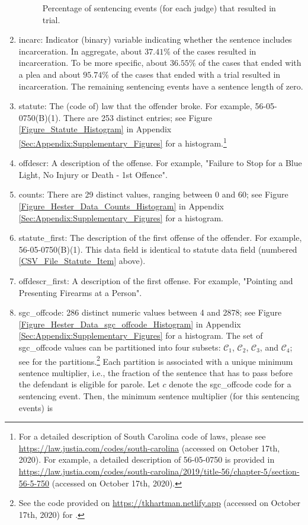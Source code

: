 \documentclass[11pt, oneside]{article}   	%
\theoremstyle{ModifiedStyle}
\begin{document}
\begin{enumerate}
\begin{figure}[H]
\begin{minipage}{\textwidth}
				\vspace{-4mm}
				\caption{Percentage of sentencing events (for each judge) that resulted in trial.}
				\label{Figure_Hester_Data_Judge_Trial_Percentage_Histogram}
			\end{minipage}
		\end{figure}
		\item incarc: Indicator (binary) variable indicating whether the sentence includes incarceration. In aggregate, about $37.41\%$ of the cases resulted in incarceration. To be more specific, about $36.55\%$ of the cases that ended with a plea and about $95.74\%$ of the cases that ended with a trial resulted in incarceration. The remaining sentencing events have a sentence length of zero.
		\item statute: The (code of) law that the offender broke. For example, 56-05-0750(B)(1). There are 253 distinct entries; see Figure \ref{Figure_Statute_Histogram} in Appendix \ref{Sec:Appendix:Supplementary_Figures} for a histogram.\footnote{For a detailed description of South Carolina code of laws, please see \url{https://law.justia.com/codes/south-carolina} (accessed on October 17th, 2020). For example, a detailed description of 56-05-0750 is provided in \url{https://law.justia.com/codes/south-carolina/2019/title-56/chapter-5/section-56-5-750} (accessed on October 17th, 2020).}
		\label{CSV_File_Statute_Item}
		\item offdescr: A description of the offense. For example, "Failure to Stop for a Blue Light, No Injury or Death - 1st Offence".
		\item counts: There are 29 distinct values, ranging between 0 and 60; see Figure \ref{Figure_Hester_Data_Counts_Histogram} in Appendix \ref{Sec:Appendix:Supplementary_Figures} for a histogram.
		\item statute\_first: The description of the first offense of the offender. For example, 56-05-0750(B)(1). This data field is identical to statute data field (numbered \ref{CSV_File_Statute_Item} above).
		\item offdescr\_first: A description of the first offense. For example, "Pointing and Presenting Firearms at a Person".
		\item sgc\_offcode: 286 distinct numeric values between 4 and 2878; see Figure \ref{Figure_Hester_Data_sgc_offcode_Histogram} in Appendix \ref{Sec:Appendix:Supplementary_Figures} for a histogram. The set of sgc\_offcode values can be partitioned into four subsets: $\mathcal{C}_1$, $\mathcal{C}_2$, $\mathcal{C}_3$, and $\mathcal{C}_4$; see \citet{Hester_Hartman_2017} for the partitions.\footnote{See the code provided on \url{https://tkhartman.netlify.app} (accessed on October 17th, 2020) for \citet{Hester_Hartman_2017}.} Each partition is associated with a unique minimum sentence multiplier, i.e., the fraction of the sentence that has to pass before the defendant is eligible for parole. Let $c$ denote the sgc\_offcode code for a sentencing event. Then, the minimum sentence multiplier (for this sentencing events) is

\end{enumerate}
\end{document}
